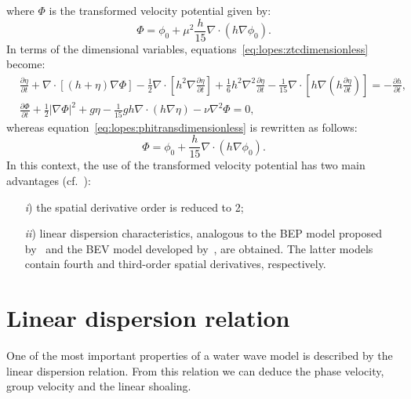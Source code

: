 where $\Phi$ is the transformed velocity potential given by:
\begin{equation}\label{eq:lopes:phitransdimensionless}
\Phi=\phi_0+\mu^2\frac{h}{15}\nabla\cdot(h\nabla\phi_0) .
\end{equation}
In terms of the dimensional
variables, equations~\eqref{eq:lopes:ztcdimensionless} become:
\begin{subequations}\label{eq:lopes:ztc}
\begin{align}
&\frac{\partial\eta}{\partial t}
  +\nabla\cdot[(h+\eta)\nabla{\Phi}] -\frac{1}{2}\nabla\cdot
  [h^{2}\nabla\frac{\partial \eta} {\partial t}]
  +\frac{1}{6}h^{2}\nabla^2\frac{\partial\eta}{\partial t}
  -\frac{1}{15}\nabla\cdot[h\nabla(h\frac{\partial\eta}
    {\partial
      t})]=-\frac{\partial h}{\partial t}, \label{eq:lopes:ztc-a}\\ &\frac{\partial
    \Phi}{\partial t} +\frac{1}{2}|\nabla\Phi|^2+g\eta-
  \frac{1}{15}gh\nabla\cdot(h\nabla\eta)-\nu\nabla^2\Phi=0, \label{eq:lopes:ztc-b}
\end{align}
\end{subequations}
whereas equation~\eqref{eq:lopes:phitransdimensionless} is
rewritten as follows:
\begin{equation}\label{eq:lopes:phitrans}
\Phi=\phi_0+\frac{h}{15}\nabla\cdot(h\nabla\phi_0) .
\end{equation}
 In this context, the use of the transformed velocity
 potential has two main advantages
 (cf.~\cite{ZhaoTengCheng2004}):
\begin{itemize}
\item[{\it i})] the spatial derivative order is reduced to 2;
\item[{\it ii})] linear dispersion characteristics,
  analogous to the  BEP model proposed
  by~\cite{ChenLiu1994} and the  BEV model
  developed by~\cite{Nwogu1993}, are obtained.
The latter models contain fourth and third-order spatial
derivatives, respectively.
\end{itemize}

\section{Linear dispersion relation}\label{sec:lopes:dispersionproperties}
One of the most important properties of a water wave model
is described by the linear dispersion relation.  From this
relation we can deduce the phase velocity, group velocity
and the linear shoaling.


